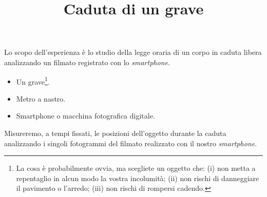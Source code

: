 \documentclass{lab1-article}
\title{Caduta di un grave}
\begin{document}
\begin{article}

\maketitle

\secintro


Lo scopo dell'esperienza \`e lo studio della legge oraria di un corpo in caduta
libera analizzando un filmato registrato con lo \emph{smartphone}.

\secmaterialsdad

\begin{itemize}
\item Un grave\footnote{La cosa \`e probabilmente ovvia, ma scegliete un oggetto
  che: (i) non metta a repentaglio in alcun modo la vostra incolumit\`a;
  (ii) non rischi di danneggiare il pavimento o l'arredo;
  (iii) non rischi di rompersi cadendo.}.
\item Metro a nastro.
\item Smartphone o macchina fotografica digitale.
\end{itemize}


\secmeasurements

Misureremo, a tempi fissati, le posizioni dell'oggetto durante la caduta
analizzando i singoli fotogrammi del filmato realizzato con il nostro
\emph{smartphone}.


\end{article}
\end{document}
